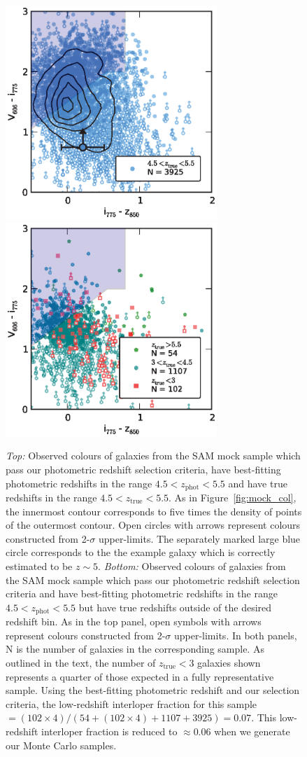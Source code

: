\begin{figure}
\centering
\includegraphics[width=80mm]{plots/figA2a.eps}
\includegraphics[width=80mm]{plots/figA2b.eps}
\caption{\emph{Top:} Observed colours of galaxies from the SAM mock sample which pass our photometric redshift selection criteria, have best-fitting photometric redshifts in the range $4.5 < z_{\text{phot}} < 5.5$ and have true redshifts in the range $4.5 < z_{\text{true}} < 5.5$. As in Figure~\ref{fig:mock_col}, the innermost contour corresponds to five times the density of points of the outermost contour. Open circles with arrows represent colours constructed from 2-$\sigma$ upper-limits. The separately marked large blue circle corresponds to the the example galaxy which is correctly estimated to be $z \sim 5$. \emph{Bottom:} Observed colours of galaxies from the SAM mock sample which pass our photometric redshift selection criteria and have best-fitting photometric redshifts in the range $4.5 < z_{\text{phot}} < 5.5$ but have true redshifts outside of the desired redshift bin. As in the top panel, open symbols with arrows represent colours constructed from 2-$\sigma$ upper-limits. In both panels, N is the number of galaxies in the corresponding sample. As outlined in the text, the number of $z_{\text{true}} < 3$ galaxies shown represents a quarter of those expected in a fully representative sample. Using the best-fitting photometric redshift and our selection criteria, the low-redshift interloper fraction for this sample $= (102 \times 4) / (54 + (102 \times 4) + 1107 + 3925) = 0.07$. This low-redshift interloper fraction is reduced to $\approx 0.06$ when we generate our Monte Carlo samples.}
\label{fig:mock_col_photz}
\end{figure}

